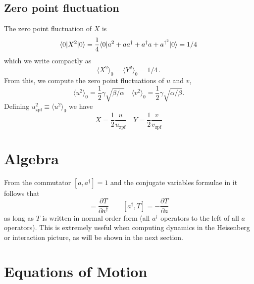 \subsection{Zero point fluctuation}

The zero point fluctuation of $X$ is
\begin{equation}
\langle 0 | X^2 | 0 \rangle = \frac{1}{4}\langle 0 | a^2 + aa^{\dagger} + a^{\dagger}a + a^{\dagger^2} | 0 \rangle = 1/4
\end{equation}
which we write compactly as
\begin{equation}
\langle X^2 \rangle_0 = \langle Y^2 \rangle_0 = 1/4 \, .
\end{equation}
From this, we compute the zero point fluctuations of $u$ and $v$, \begin{equation}
\langle u^2 \rangle_0 = \frac{1}{2}\gamma \sqrt{\beta / \alpha} \quad \langle v^2 \rangle_0 = \frac{1}{2}\gamma \sqrt{\alpha / \beta} . \end{equation}
Defining $u_{\textrm{zpf}}^2 \equiv \langle u^2 \rangle_0 $ we have \begin{equation}
X = \frac{1}{2}\frac{u}{u_{\textrm{zpf}}} \quad Y = \frac{1}{2}\frac{v}{v_{\textrm{zpf}}} \end{equation}

\section{Algebra}

From the commutator $ [a,a^{\dagger}]=1 $ and the conjugate variables formulae in \citeinternaltype {} it follows that \begin{equation}
[a,T] = \frac{\partial T}{\partial a^{\dagger}} \qquad [a^{\dagger},T] = -\frac{\partial T}{\partial a}\end{equation}
as long as $T$ is written in normal order form (all $a^{\dagger}$ operators to the left of all $a$ operators).
This is extremely useful when computing dynamics in the Heisenberg or interaction picture, as will be shown in the next section.

\section{Equations of Motion}

